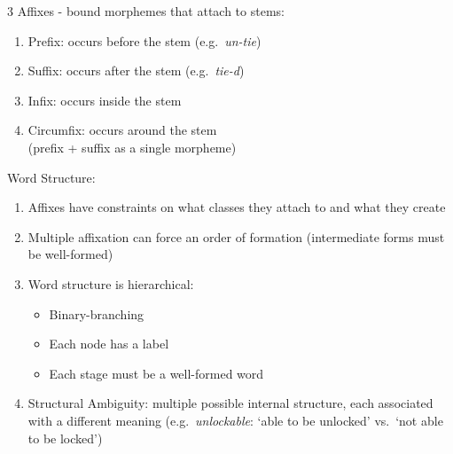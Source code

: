 \documentclass[12pt, a4paper]{article}
\begin{document}
\begin{multicols*}{3}
Affixes - bound morphemes that attach to stems:
\begin{enumerate}[\roman*.]
  \item Prefix: occurs before the stem (e.g.\ \textit{un-tie})
  \item Suffix: occurs after the stem (e.g.\ \textit{tie-d})
  \item Infix: occurs inside the stem
  \item Circumfix: occurs around the stem\\(prefix + suffix as a single morpheme)
\end{enumerate}

Word Structure:
\begin{enumerate}[\roman*.]
  \item Affixes have constraints on what classes they attach to and what they create
  \item Multiple affixation can force an order of formation (intermediate forms must be well-formed)
  \item Word structure is hierarchical:
    \begin{itemize}[leftmargin=*]\vspace{3pt}
      \item Binary-branching
      \item Each node has a label
      \item Each stage must be a well-formed word
    \end{itemize}
  \item Structural Ambiguity: multiple possible internal structure, each associated with a different meaning (e.g.\ \textit{unlockable}: `able to be unlocked' vs.\ `not able to be locked')
\end{enumerate}

\begin{center}
\end{center}
\colbreak


\end{multicols*}
\end{document}
